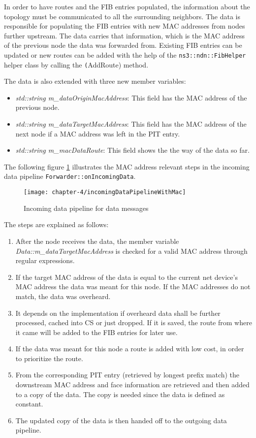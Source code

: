 In order to have routes and the FIB entries populated, the information about the topology must be communicated to all the surrounding neighbors. The data is responsible for populating the FIB entries with new MAC addresses from nodes further upstream. The data carries that information, which is the MAC address of the previous node the data was forwarded from. Existing FIB entries can be updated or new routes can be added with the help of the \texttt{ns3::ndn::FibHelper} helper class by calling the \texttt(AddRoute) method.

The data is also extended with three new member variables:

\begin{itemize}
\item \emph{std::string m\_dataOriginMacAddress}: This field has the MAC address of the previous node.
\item \emph{std::string m\_dataTargetMacAddress}: This field has the MAC address of the next node if a MAC address was left in the PIT entry.
\item \emph{std::string m\_macDataRoute}: This field shows the the way of the data so far.
\end{itemize}

The following figure \ref{fig:incomingDataPipelineWithMac} illustrates the MAC address relevant steps in the incoming data pipeline \texttt{Forwarder::onIncomingData}.

\begin{figure}[H]
  \centering
  \texttt{[image: chapter-4/incomingDataPipelineWithMac]}
  \caption{Incoming data pipeline for data messages}
  \label{fig:incomingDataPipelineWithMac}
\end{figure}

The steps are explained as follows:

\begin{enumerate}
\item After the node receives the data, the member variable  \emph{Data::m\_dataTargetMacAddress} is checked for a valid MAC address through regular expressions.
\item If the target MAC address of the data is equal to the current net device's MAC address the data was meant for this node. If the MAC addresses do not match, the data was overheard.
\item It depends on the implementation if overheard data shall be further processed, cached into CS or just dropped. If it is saved, the route from where it came will be added to the FIB entries for later use.
\item If the data was meant for this node a route is added with low cost, in order to prioritize the route.
\item From the corresponding PIT entry (retrieved by longest prefix match) the downstream MAC address and face information are retrieved and then added to a copy of the data. The copy is needed since the data is defined as constant.
\item The updated copy of the data is then handed off to the outgoing data pipeline.
\end{enumerate}

